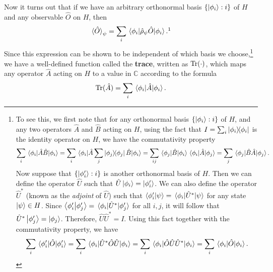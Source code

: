       Now it turns out that if we have an arbitrary orthonormal basis $\{\ket{\phi_i}:i\}$ of $H$ and any observable $\hat{O}$ on $H$, then 
    \begin{equation}\label{exptrace}\ev*{\hat{O}}_\psi=\sum_{i}\ev*{\hat{\rho}_\psi\hat{O}}{\phi_i}.\protect\footnotemark
    \end{equation}
    Since this expression can be shown to be independent of
     which basis we choose,\footnote{To see this, we first note that for any orthonormal basis $\{\ket{\phi_i}:i\}$ of $H$, and any two operators $\hat{A}$ and $\hat{B}$ acting on $H$, using the fact that $I=\sum_i\dyad{\phi_i}$ is the identity operator on $H$, we have the commutativity property $$\sum_i\ev*{\hat{A}\hat{B}}{\phi_i}=\sum_i\ev*{\hat{A}\sum_j\dyad{\phi_j}\hat{B}}{\phi_i}=\sum_{ij}\mel*{\phi_j}{\hat{B}}{\phi_i}\mel*{\phi_i}{\hat{A}}{\phi_j}=\sum_j\ev*{\hat{B}\hat{A}}{\phi_j}.$$ Now suppose that $\{\ket{\phi_i'}:i\}$  is another orthonormal basis of $H$. Then we can define the operator $\hat{U}$ such that $\hat{U}\ket{\phi_i}=\ket{\phi_i'}$. We can also define the operator $\hat{U}^*$ (known as the \emph{adjoint} of $\hat{U}$) %
%
     such that $\ip{\phi_i'}{\psi}=\mel*{\phi_i}{\hat{U}^*}{\psi}$ for any state $\ket{\psi}\in H$. Since $\ip{\phi_i'}{\phi_j'}=\mel*{\phi_i}{\hat{U}^*}{\phi_j'}$ for all $i, j$, it will follow that  $\hat{U}^*\ket{\phi_j'}=\ket{\phi_j}$. Therefore, $\hat{U}\hat{U}^*=I$. Using this fact together with the commutativity property, we have 
    $$\sum_i \ev*{\hat{O}}{\phi_i'}= \sum_i\ev*{\hat{U}^*\hat{O}\hat{U}}{\phi_i}
    =\sum_i\ev*{\hat{O}\hat{U}\hat{U}^*}{\phi_i}=\sum_i\ev*{\hat{O}}{\phi_i}.$$} 
     we have a well-defined function called the \textbf{trace}, written as $\operatorname{Tr}(\cdot)$, which maps any operator $\hat{A}$ acting on $H$ to a value in $\mathbb{C}$ according to the formula
    \begin{equation}\Tr (\hat{A})=\sum_i \ev*{\hat{A}}{\phi_i}.\label{tracedef}\end{equation}%
%
